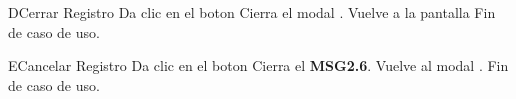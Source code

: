 \begin{UCtrayectoriaA}{D}{Cerrar Registro}
	\UCpaso[\UCactor] Da clic en el boton 
	\UCpaso Cierra el modal .
	\UCpaso Vuelve a la pantalla 
	\UCpaso Fin de caso de uso.
\end{UCtrayectoriaA}

\begin{UCtrayectoriaA}{E}{Cancelar Registro}
	\UCpaso[\UCactor] Da clic en el boton 
	\UCpaso Cierra el {\bf MSG2.6}.
	\UCpaso Vuelve al modal . 
	\UCpaso Fin de caso de uso.
\end{UCtrayectoriaA}
